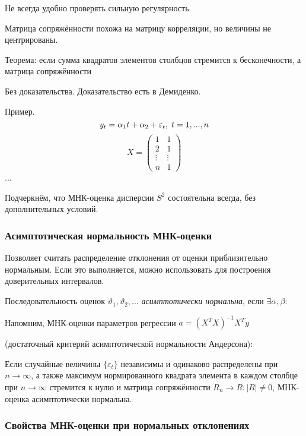 \documentclass[main.tex]{subfiles}
\begin{document}
Не всегда удобно проверять сильную регулярность.


Матрица сопряжённости похожа на матрицу корреляции, но величины не центрированы.

Теорема: если сумма квадратов элементов столбцов стремится к бесконечности, а матрица сопряжённости

Без доказательства.
Доказательство есть в Демиденко.

Пример.
$$ y_t = \alpha_1 t + \alpha_2 + \varepsilon_t, \thickspace t = 1, ..., n $$
$$ X = \begin{pmatrix}
    1 & 1 \\ 2 & 1 \\ \vdots & \vdots \\ n & 1
\end{pmatrix} $$
...

Подчеркнём, что МНК-оценка дисперсии $ S^2 $ состоятельна всегда, без дополнительных условий.

\subsubsection{Асимптотическая нормальность МНК-оценки}

Позволяет считать распределение отклонения от оценки приблизительно нормальным.
Если это выполняется, можно использовать для построения доверительных интервалов.

Последовательность оценок $ \vartheta_1, \vartheta_2, ... $ \emph{асимптотически нормальна}, если $ \exists \alpha, \beta : $ %

Напомним, МНК-оценки параметров регрессии
$ a = (X^TX)^{-1}X^Ty $ %

\begin{theorem}
    (достаточный критерий асимптотической нормальности Андерсона):

    Если случайные величины $ \{\varepsilon_t\} $ независимы и одинаково распределены при $ n \to \infty $, а также максимум нормированного квадрата элемента в каждом столбце при $ n \to \infty $ стремится к нулю и матрица сопряжённости $ R_n \to R : |R| \ne 0 $,  МНК-оценка асимптотически нормальна.
\end{theorem}



\subsubsection{Свойства МНК-оценки при нормальных отклонениях}
\end{document}
